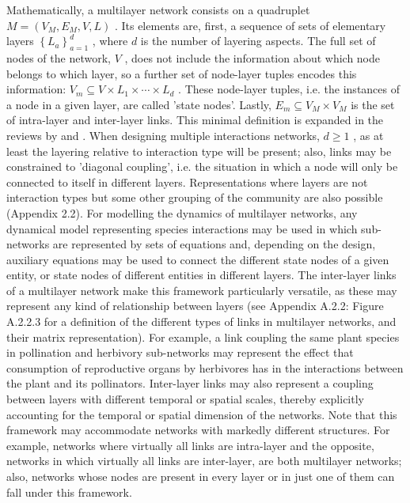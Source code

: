 Mathematically, a multilayer network consists on a quadruplet  $M=\left(V_M,E_M,V,L\right)$  . Its elements are, first, a sequence of sets of elementary layers  $\left\{L_a\right\}_{a=1}^d$  , where  $d$  is the number of layering aspects. The full set of nodes of the network,  $V$  , does not include the information about which node belongs to which layer, so a further set of node-layer tuples encodes this information:  $V_m{\subseteq}V\times L_1\times {\cdots}\times L_d$  . These node-layer tuples, i.e. the instances of a node in a given layer, are called {}'state nodes{}'. Lastly,  $E_m{\subseteq}V_M\times V_M$  is the set of intra-layer and inter-layer links. This minimal definition is expanded in the reviews by \cite{Kivela2014} and \cite{Pilosof2017}. When designing multiple interactions networks,  $d{\geq}1$  , as at least the layering relative to interaction type will be present; also, links may be constrained to {}'diagonal coupling{}', i.e. the situation in which a node will only be connected to itself in different layers. Representations where layers are not interaction types but some other grouping of the community are also possible (Appendix 2.2). For modelling the dynamics of multilayer networks, any dynamical model representing species interactions may be used in which sub-networks are represented by sets of equations and, depending on the design, auxiliary equations may be used to connect the different state nodes of a given entity, or state nodes of different entities in different layers. The inter-layer links of a multilayer network make this framework particularly versatile, as these may represent any kind of relationship between layers (see Appendix A.2.2: Figure A.2.2.3 for a definition of the different types of links in multilayer networks, and their matrix representation). For example, a link coupling the same plant species in pollination and herbivory sub-networks may represent the effect that consumption of reproductive organs by herbivores has in the interactions between the plant and its pollinators. Inter-layer links may also represent a coupling between layers with different temporal or spatial scales, thereby explicitly accounting for the temporal or spatial dimension of the networks. Note that this framework may accommodate networks with markedly different structures. For example, networks where virtually all links are intra-layer and the opposite, networks in which virtually all links are inter-layer, are both multilayer networks; also, networks whose nodes are present in every layer or in just one of them can fall under this framework.

